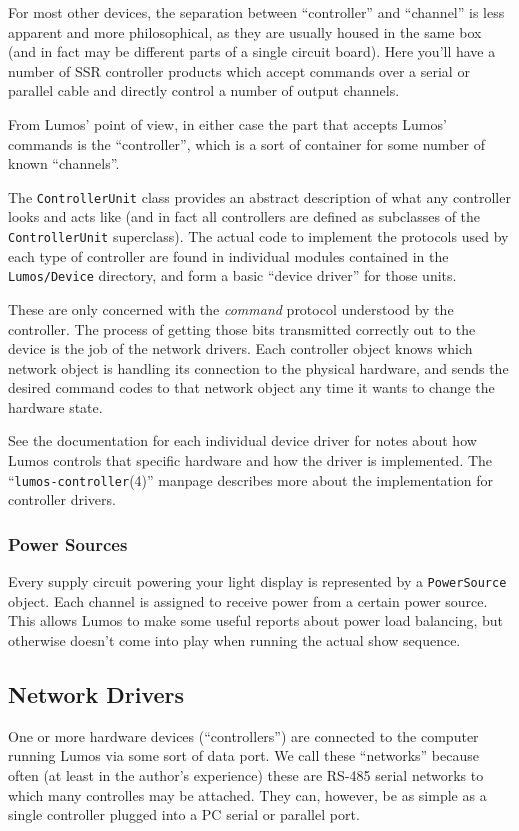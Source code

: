 \documentclass{article}
\begin{document}
For most other devices, the separation between ``controller'' and
``channel'' is less apparent and more philosophical, as they are usually
housed in the same box (and in fact may be different parts of a single
circuit board).  Here you'll have a number of SSR controller products
which accept commands over a serial or parallel cable and directly
control a number of output channels.

From Lumos' point of view, in either case the part that accepts Lumos'
commands is the ``controller'', which is a sort of container for some
number of known ``channels''.  

The {\tt ControllerUnit} class provides an abstract description of what
any controller looks and acts like (and in fact all controllers are 
defined as subclasses of 
the {\tt ControllerUnit} superclass).  The actual code to implement the
protocols used by each type of controller are found in individual 
modules contained in the {\tt Lumos/Device} directory, and form a basic
``device driver'' for those units.  

These are only concerned with the
\emph{command} protocol understood by the controller.  The process of
getting those bits transmitted correctly out to the device is the job
of the network drivers.  Each controller object knows which network
object is handling its connection to the physical hardware, and sends
the desired command codes to that network object any time it wants to
change the hardware state.

See the documentation for each individual device driver for notes
about how Lumos controls that specific hardware and how the driver 
is implemented.  The ``{\tt lumos-controller}(4)'' manpage describes
more about the implementation for controller drivers.

\subsubsection{Power Sources}
Every supply circuit powering your light display is represented by
a {\tt PowerSource} object.  Each channel is assigned to receive power
from a certain power source.  This allows Lumos to make some useful
reports about power load balancing, but otherwise doesn't come into
play when running the actual show sequence.

\subsection{Network Drivers}
One or more hardware devices (``controllers'') are connected to the
computer running Lumos via some sort of data port.  We call these
``networks'' because often (at least in the author's experience) these
are RS-485 serial networks to which many controlles may be attached.
They can, however, be as simple as a single controller plugged into a
PC serial or parallel port.
\end{document}
